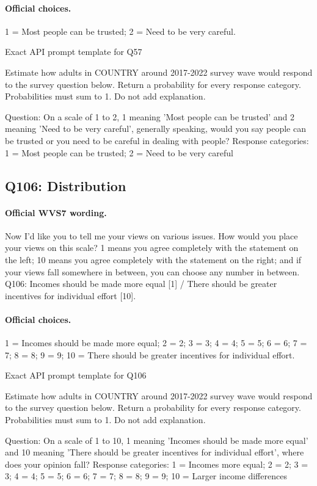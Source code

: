 \paragraph{Official choices.} 1 = Most people can be trusted; 2 = Need to be very careful.

\begin{promptlisting}{Exact API prompt template for Q57}

Estimate how adults in {{COUNTRY}} around 2017-2022 survey wave would respond to the survey question below.
Return a probability for every response category. Probabilities must sum to 1. Do not add explanation.

Question: On a scale of 1 to 2, 1 meaning 'Most people can be trusted' and 2 meaning 'Need to be very careful', generally speaking, would you say people can be trusted or you need to be careful in dealing with people?
Response categories: 1 = Most people can be trusted; 2 = Need to be very careful

\end{promptlisting}

\subsection{Q106: Distribution}

\paragraph{Official WVS7 wording.} Now I'd like you to tell me your views on various issues. How would you place your views on this scale? 1 means you agree completely with the statement on the left; 10 means you agree completely with the statement on the right; and if your views fall somewhere in between, you can choose any number in between. Q106: Incomes should be made more equal [1] / There should be greater incentives for individual effort [10]. \citep[p.~7]{wvs7masterquestionnaire}

\paragraph{Official choices.} 1 = Incomes should be made more equal; 2 = 2; 3 = 3; 4 = 4; 5 = 5; 6 = 6; 7 = 7; 8 = 8; 9 = 9; 10 = There should be greater incentives for individual effort.

\begin{promptlisting}{Exact API prompt template for Q106}

Estimate how adults in {{COUNTRY}} around 2017-2022 survey wave would respond to the survey question below.
Return a probability for every response category. Probabilities must sum to 1. Do not add explanation.

Question: On a scale of 1 to 10, 1 meaning 'Incomes should be made more equal' and 10 meaning 'There should be greater incentives for individual effort', where does your opinion fall?
Response categories: 1 = Incomes more equal; 2 = 2; 3 = 3; 4 = 4; 5 = 5; 6 = 6; 7 = 7; 8 = 8; 9 = 9; 10 = Larger income differences

\end{promptlisting}

